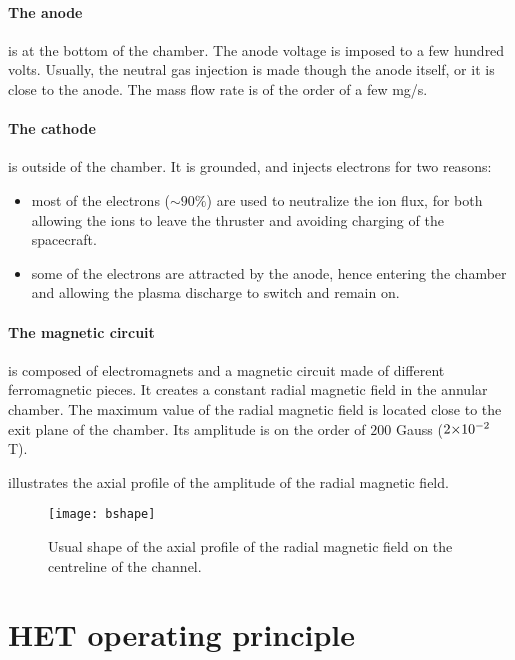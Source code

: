   \paragraph{The anode} is at the bottom of the chamber.
  The anode voltage is imposed to a few hundred volts.
  Usually, the neutral gas injection is made though the anode itself, or it is close to the anode.
  The mass flow rate is of the order of a few mg/s.

  \paragraph{The cathode} is outside of the chamber.
  It is grounded, and injects electrons for two reasons\string:
  \begin{itemize}
    \item most of the electrons ($\sim 90 \%$) are used to neutralize the ion flux, for both allowing the ions to leave the thruster and avoiding charging of the spacecraft.
    \item some of the electrons are attracted by the anode, hence entering the chamber and allowing the plasma discharge to switch and remain on.
  \end{itemize}

  \paragraph{The magnetic circuit} is composed of electromagnets and a magnetic circuit made of different ferromagnetic pieces.
  It creates a constant radial magnetic field in the annular chamber.
  The maximum value of the radial magnetic field is located close to the exit plane of the chamber.
  Its amplitude is on the order of $200$ Gauss (${{2}{\times}10^{-2}}$ T).

   illustrates the axial profile of the amplitude of the radial magnetic field.
  \begin{figure}[hbtp]
    \centering
    \texttt{[image: bshape]}
    \caption{Usual shape of the axial profile of the radial magnetic field on the centreline of the channel.}
    \label{fig-bshape}
  \end{figure}


\section*{HET operating principle}



